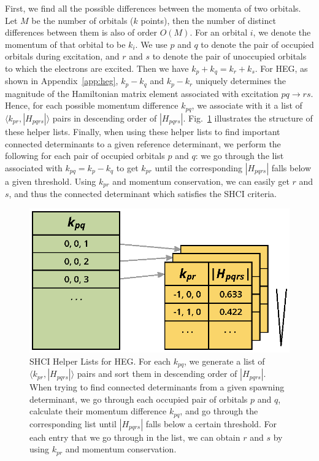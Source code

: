\documentclass[%
reprint,
 superscriptaddress,
 amsmath,amssymb,
 aps,
]{revtex4-1}
\begin{document}
First, we find all the possible differences between the momenta of two orbitals.
Let $M$ be the number of orbitals ($k$ points), then the number of distinct differences between them is also of order $O(M)$.
For an orbital $i$, we denote the momentum of that orbital to be $k_{i}$.
We use $p$ and $q$ to denote the pair of occupied orbitals during excitation, and $r$ and $s$ to denote the pair of unoccupied orbitals to which the electrons are excited.
Then we have $k_p + k_q = k_r + k_s$.
For HEG, as shown in Appendix~\ref{app:heg}, $k_p - k_q$ and $k_p - k_r$ uniquely determines the magnitude of the Hamiltonian matrix element associated with excitation $pq\to rs$.
Hence, for each possible momentum difference $k_{pq}$, we associate with it a list of $\langle k_{pr}, |H_{pqrs}|\rangle$ pairs in descending order of $|H_{pqrs}|$.
Fig.~\ref{fig:helper} illustrates the structure of these helper lists.
Finally, when using these helper lists to find important connected determinants to a given reference determinant, we perform the following for each pair of occupied orbitals $p$ and $q$: we go through the list associated with $k_{pq} = k_p - k_q$ to get $k_{pr}$ until the corresponding $|H_{pqrs}|$ falls below a given threshold.
Using $k_{pr}$ and momentum conservation, we can easily get $r$ and $s$, and thus the connected determinant which satisfies the SHCI criteria.
\begin{figure}
  \begin{center}
  \includegraphics[width=0.9\linewidth]{figs/HelperList.eps}
  \end{center}
  \vspace{-0.2cm}
  \caption{SHCI Helper Lists for HEG.
  For each $k_{pq}$, we generate a list of $\langle k_{pr}, |H_{pqrs}|\rangle$ pairs and sort them in descending order of $|H_{pqrs}|$.
  When trying to find connected determinants from a given spawning determinant, we go through each occupied pair of orbitals $p$ and $q$, calculate their momentum difference $k_{pq}$, and go through the corresponding list until $|H_{pqrs}|$ falls below a certain threshold.
  For each entry that we go through in the list, we can obtain $r$ and $s$ by using $k_{pr}$ and momentum conservation.
  }
  \label{fig:helper}
\end{figure}
\end{document}
